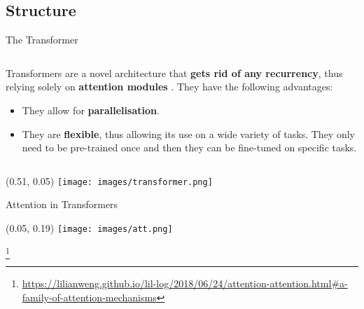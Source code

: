 \documentclass[UKenglish]{beamer}
\begin{document}
\subsection{Structure}
\begin{frame}{The Transformer}
\begin{columns}[onlytextwidth]
    \begin{column}{0.50\textwidth}
    Transformers are a novel architecture that \textbf{gets rid of any recurrency}, thus relying solely on \textbf{attention modules} \cite{transformer}. They have the following advantages:
    \begin{itemize}
        \item They allow for \textbf{parallelisation}.
        \item They are \textbf{flexible}, thus allowing its use on a wide variety of tasks. They only need to be pre-trained once and then they can be fine-tuned on specific tasks.
    \end{itemize}
    \end{column}
\end{columns}
\begin{textblock}{0.5}(0.51, 0.05)
        \texttt{[image: images/transformer.png]}
\end{textblock}
\end{frame}
\begin{frame}{Attention in Transformers}
\begin{textblock}{0.05}(0.05, 0.19)
    \texttt{[image: images/att.png]}
\end{textblock}
\footnote{\url{https://lilianweng.github.io/lil-log/2018/06/24/attention-attention.html#a-family-of-attention-mechanisms}}
\end{frame}
\end{document}
